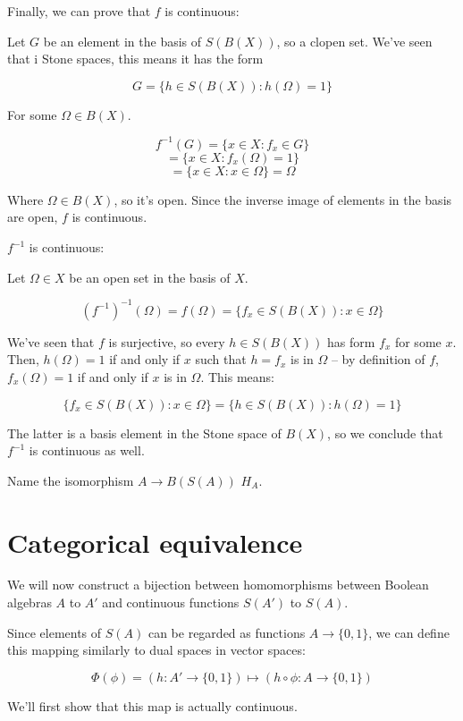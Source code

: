 \documentclass{article}
\begin{document}
      Finally, we can prove that $f$ is continuous:

      Let $G$ be an element in the basis of $S(B(X))$, so a clopen set. We've
      seen that i Stone spaces, this means it has the form

      \[G = \{h \in S(B(X)): h(\Omega) = 1\}\]

      For some $\Omega \in B(X)$.

      \[f^{-1}(G) = \{x \in X : f_x \in G\}\]
      \[ = \{x \in X : f_x(\Omega) = 1\}\]
      \[ = \{x \in X : x \in \Omega\} = \Omega\]

      Where $\Omega \in B(X)$, so it's open. Since the inverse image of elements
      in the basis are open, $f$ is continuous.

      $f^{-1}$ is continuous:

      Let $\Omega \in X$ be an open set in the basis of $X$.

      \[(f^{-1})^{-1}(\Omega) = f(\Omega) = \{f_x \in S(B(X)) : x \in \Omega\}\]

      We've seen that $f$ is surjective, so every $h \in S(B(X))$ has form $f_x$
      for some $x$. Then, $h(\Omega) = 1$ if and only if $x$ such that $h = f_x$
      is in $\Omega$ -- by definition of $f$, $f_x(\Omega) = 1$ if and only if
      $x$ is in $\Omega$. This means:

      \[\{f_x \in S(B(X)) : x \in \Omega\} = \{h \in S(B(X)) : h(\Omega) = 1\}\]

      The latter is a basis element in the Stone space of $B(X)$, so we conclude
      that $f^{-1}$ is continuous as well.

      Name the isomorphism $A \to B(S(A))$ $H_A$.

    \section{Categorical equivalence}

      We will now construct a bijection between homomorphisms between Boolean
      algebras $A$ to $A'$ and continuous functions $S(A')$ to $S(A)$.

      Since elements of $S(A)$ can be regarded as functions $A \rightarrow
      \{0,1\}$, we can define this mapping similarly to dual spaces in vector
      spaces:

      \[\Phi(\phi) = (h : A' \rightarrow \{0,1\}) \mapsto (h \circ \phi : A
      \rightarrow \{0,1\})\]

      We'll first show that this map is actually continuous.
\end{document}
